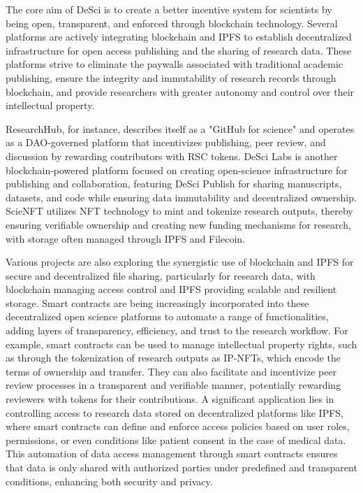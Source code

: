 \documentclass{article}
\begin{document}
The core aim of DeSci is to create a better incentive system for scientists by being open, transparent, and enforced through blockchain technology. Several platforms are actively integrating blockchain and IPFS to establish decentralized infrastructure for open access publishing and the sharing of research data. These platforms strive to eliminate the paywalls associated with traditional academic publishing, ensure the integrity and immutability of research records through blockchain, and provide researchers with greater autonomy and control over their intellectual property.

ResearchHub, for instance, describes itself as a "GitHub for science" and operates as a DAO-governed platform that incentivizes publishing, peer review, and discussion by rewarding contributors with RSC tokens. DeSci Labs is another blockchain-powered platform focused on creating open-science infrastructure for publishing and collaboration, featuring DeSci Publish for sharing manuscripts, datasets, and code while ensuring data immutability and decentralized ownership. ScieNFT utilizes NFT technology to mint and tokenize research outputs, thereby ensuring verifiable ownership and creating new funding mechanisms for research, with storage often managed through IPFS and Filecoin.

Various projects are also exploring the synergistic use of blockchain and IPFS for secure and decentralized file sharing, particularly for research data, with blockchain managing access control and IPFS providing scalable and resilient storage. Smart contracts are being increasingly incorporated into these decentralized open science platforms to automate a range of functionalities, adding layers of transparency, efficiency, and trust to the research workflow. For example, smart contracts can be used to manage intellectual property rights, such as through the tokenization of research outputs as IP-NFTs, which encode the terms of ownership and transfer. They can also facilitate and incentivize peer review processes in a transparent and verifiable manner, potentially rewarding reviewers with tokens for their contributions. A significant application lies in controlling access to research data stored on decentralized platforms like IPFS, where smart contracts can define and enforce access policies based on user roles, permissions, or even conditions like patient consent in the case of medical data. This automation of data access management through smart contracts ensures that data is only shared with authorized parties under predefined and transparent conditions, enhancing both security and privacy.
\end{document}
